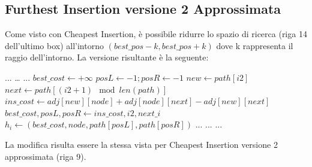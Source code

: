 \documentclass[a4paper,12pt]{report}
\begin{document}
\subsection{Furthest Insertion versione 2 Approssimata}
Come visto con Cheapest Insertion, è possibile ridurre lo spazio di ricerca (riga 14 dell'ultimo box) all'intorno $(best\_pos - k, best\_pos + k)$ dove k rappresenta il raggio dell'intorno. La versione risultante è la seguente:
\begin{tcolorbox}[colframe=black, colback=white, boxrule=0.5pt, title=Furthest Insertion Versione 2 Approssimata, coltitle=black, fonttitle=\bfseries, colbacktitle=white, breakable]
  \begin{algorithmic}[1]
    \State ...
      \State \dots
        \State ...
          \State $best\_cost \gets +\infty$
          \State $posL \gets -1; posR \gets -1$
            \State $new \gets path[i2]$
            \State $next \gets path[(i2 + 1) \mod len(path)]$
            \State $ins\_cost \gets adj[new][node] + adj[node][next] - adj[new][next]$
              \State $best\_cost, posL, posR \gets ins\_cost, i2, next\_i$
            \EndIf
          \EndFor
          \State $h_i \gets (best\_cost, node, path[posL], path[posR])$
        \EndIf
        \State ...
      \EndFor
      \State ...
    \EndWhile
    \State ...
  \end{algorithmic}
\end{tcolorbox}
La modifica risulta essere la stessa vista per Cheapest Insertion versione 2 approssimata (riga 9).
\end{document}
